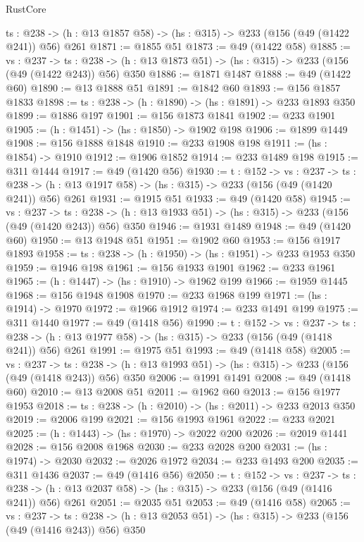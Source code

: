 \begin{lexlean}{RustCore}
\begin{coremodule}
  {ts : @238} -> (h : @13 @1857 @58) -> (hs : @315) -> @233 (@156 (@49 (@1422 @241)) @56) @261
@1871 := @1855 @51
@1873 := @49 (@1422 @58)
@1885 := {vs : @237} ->
  {ts : @238} -> (h : @13 @1873 @51) -> (hs : @315) -> @233 (@156 (@49 (@1422 @243)) @56) @350
@1886 := @1871 @1487
@1888 := @49 (@1422 @60)
@1890 := @13 @1888 @51
@1891 := @1842 @60
@1893 := @156 @1857 @1833
@1898 := {ts : @238} -> (h : @1890) -> (hs : @1891) -> @233 @1893 @350
@1899 := @1886 @197
@1901 := @156 @1873 @1841
@1902 := @233 @1901
@1905 := (h : @1451) -> (hs : @1850) -> @1902 @198
@1906 := @1899 @1449
@1908 := @156 @1888 @1848
@1910 := @233 @1908 @198
@1911 := (hs : @1854) -> @1910
@1912 := @1906 @1852
@1914 := @233 @1489 @198
@1915 := @311 @1444
@1917 := @49 (@1420 @56)
@1930 := {t : @152} ->
  {vs : @237} ->
  {ts : @238} -> (h : @13 @1917 @58) -> (hs : @315) -> @233 (@156 (@49 (@1420 @241)) @56) @261
@1931 := @1915 @51
@1933 := @49 (@1420 @58)
@1945 := {vs : @237} ->
  {ts : @238} -> (h : @13 @1933 @51) -> (hs : @315) -> @233 (@156 (@49 (@1420 @243)) @56) @350
@1946 := @1931 @1489
@1948 := @49 (@1420 @60)
@1950 := @13 @1948 @51
@1951 := @1902 @60
@1953 := @156 @1917 @1893
@1958 := {ts : @238} -> (h : @1950) -> (hs : @1951) -> @233 @1953 @350
@1959 := @1946 @198
@1961 := @156 @1933 @1901
@1962 := @233 @1961
@1965 := (h : @1447) -> (hs : @1910) -> @1962 @199
@1966 := @1959 @1445
@1968 := @156 @1948 @1908
@1970 := @233 @1968 @199
@1971 := (hs : @1914) -> @1970
@1972 := @1966 @1912
@1974 := @233 @1491 @199
@1975 := @311 @1440
@1977 := @49 (@1418 @56)
@1990 := {t : @152} ->
  {vs : @237} ->
  {ts : @238} -> (h : @13 @1977 @58) -> (hs : @315) -> @233 (@156 (@49 (@1418 @241)) @56) @261
@1991 := @1975 @51
@1993 := @49 (@1418 @58)
@2005 := {vs : @237} ->
  {ts : @238} -> (h : @13 @1993 @51) -> (hs : @315) -> @233 (@156 (@49 (@1418 @243)) @56) @350
@2006 := @1991 @1491
@2008 := @49 (@1418 @60)
@2010 := @13 @2008 @51
@2011 := @1962 @60
@2013 := @156 @1977 @1953
@2018 := {ts : @238} -> (h : @2010) -> (hs : @2011) -> @233 @2013 @350
@2019 := @2006 @199
@2021 := @156 @1993 @1961
@2022 := @233 @2021
@2025 := (h : @1443) -> (hs : @1970) -> @2022 @200
@2026 := @2019 @1441
@2028 := @156 @2008 @1968
@2030 := @233 @2028 @200
@2031 := (hs : @1974) -> @2030
@2032 := @2026 @1972
@2034 := @233 @1493 @200
@2035 := @311 @1436
@2037 := @49 (@1416 @56)
@2050 := {t : @152} ->
  {vs : @237} ->
  {ts : @238} -> (h : @13 @2037 @58) -> (hs : @315) -> @233 (@156 (@49 (@1416 @241)) @56) @261
@2051 := @2035 @51
@2053 := @49 (@1416 @58)
@2065 := {vs : @237} ->
  {ts : @238} -> (h : @13 @2053 @51) -> (hs : @315) -> @233 (@156 (@49 (@1416 @243)) @56) @350

\end{coremodule}
\end{lexlean}
